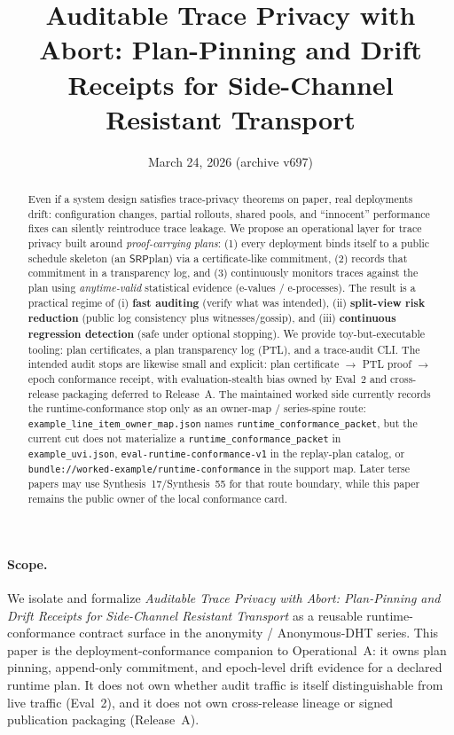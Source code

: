 \documentclass[11pt]{article}
\title{Auditable Trace Privacy with Abort: Plan-Pinning and Drift Receipts for Side-Channel Resistant Transport}
\author{}
\date{March 24, 2026 (archive v697)}
\newcommand{\SRP}{\ensuremath{\mathsf{SRP}}}
\begin{document}
\maketitle

\begin{abstract}
Even if a system design satisfies trace-privacy theorems on paper, real deployments drift:
configuration changes, partial rollouts, shared pools, and ``innocent'' performance fixes can silently reintroduce trace leakage.
We propose an operational layer for trace privacy built around \emph{proof-carrying plans}:
(1) every deployment binds itself to a public schedule skeleton (an \SRP plan) via a certificate-like commitment,
(2) records that commitment in a transparency log, and
(3) continuously monitors traces against the plan using \emph{anytime-valid} statistical evidence (e-values / e-processes).
The result is a practical regime of (i) \textbf{fast auditing} (verify what was intended),
(ii) \textbf{split-view risk reduction} (public log consistency plus witnesses/gossip), and
(iii) \textbf{continuous regression detection} (safe under optional stopping).
We provide toy-but-executable tooling: plan certificates, a plan transparency log (PTL), and a trace-audit CLI.
The intended audit stops are likewise small and explicit: plan certificate $\rightarrow$ PTL proof $\rightarrow$ epoch conformance receipt, with evaluation-stealth bias owned by Eval~2 and cross-release packaging deferred to Release~A. The maintained worked side currently records the runtime-conformance stop only as an owner-map / series-spine route: \nolinkurl{example_line_item_owner_map.json} names \nolinkurl{runtime_conformance_packet}, but the current cut does not materialize a \nolinkurl{runtime_conformance_packet} in \nolinkurl{example_uvi.json}, \nolinkurl{eval-runtime-conformance-v1} in the replay-plan catalog, or \nolinkurl{bundle://worked-example/runtime-conformance} in the support map. Later terse papers may use Synthesis~17/Synthesis~55 for that route boundary, while this paper remains the public owner of the local conformance card.\cite{series:workedexample,series:seriesspines}
\end{abstract}

\paragraph{Scope.}
We isolate and formalize \emph{Auditable Trace Privacy with Abort: Plan-Pinning and Drift Receipts for Side-Channel Resistant Transport} as a reusable runtime-conformance contract surface in the anonymity / Anonymous-DHT series.
This paper is the deployment-conformance companion to Operational~A: it owns plan pinning, append-only commitment, and epoch-level drift evidence for a declared runtime plan.
It does not own whether audit traffic is itself distinguishable from live traffic (Eval~2), and it does not own cross-release lineage or signed publication packaging (Release~A).
\end{document}
